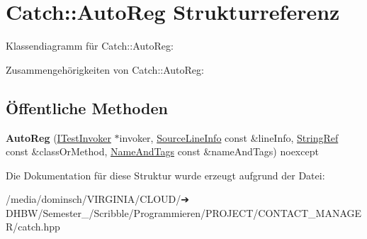 \hypertarget{structCatch_1_1AutoReg}{}\section{Catch\+:\+:Auto\+Reg Strukturreferenz}
\label{structCatch_1_1AutoReg}


Klassendiagramm für Catch\+:\+:Auto\+Reg\+:


Zusammengehörigkeiten von Catch\+:\+:Auto\+Reg\+:
\subsection*{Öffentliche Methoden}
\begin{DoxyCompactItemize}
\item 
\mbox{\label{structCatch_1_1AutoReg_a7eba02fb9d80b9896bf5a6517369af28}} 
{\bfseries Auto\+Reg} (\hyperlink{structCatch_1_1ITestInvoker}{I\+Test\+Invoker} $\ast$invoker, \hyperlink{structCatch_1_1SourceLineInfo}{Source\+Line\+Info} const \&line\+Info, \hyperlink{classCatch_1_1StringRef}{String\+Ref} const \&class\+Or\+Method, \hyperlink{structCatch_1_1NameAndTags}{Name\+And\+Tags} const \&name\+And\+Tags) noexcept
\end{DoxyCompactItemize}


Die Dokumentation für diese Struktur wurde erzeugt aufgrund der Datei\+:\begin{DoxyCompactItemize}
\item 
/media/dominsch/\+V\+I\+R\+G\+I\+N\+I\+A/\+C\+L\+O\+U\+D/➔ D\+H\+B\+W/\+Semester\+\_/\+Scribble/\+Programmieren/\+P\+R\+O\+J\+E\+C\+T/\+C\+O\+N\+T\+A\+C\+T\+\_\+\+M\+A\+N\+A\+G\+E\+R/catch.\+hpp\end{DoxyCompactItemize}
